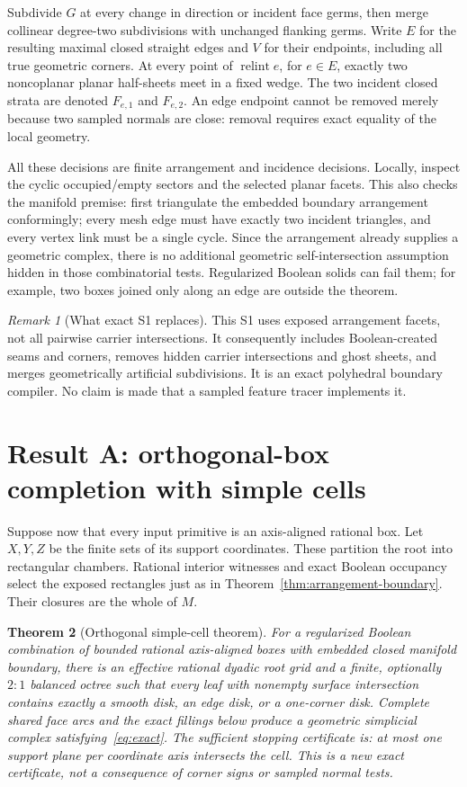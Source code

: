 \documentclass[11pt]{article}
\newtheorem{theorem}{Theorem}[section]
\theoremstyle{definition}
\theoremstyle{remark}
\newtheorem{remark}[theorem]{Remark}
\newcommand{\relint}{\operatorname{relint}}
\begin{document}
Subdivide $G$ at every change in direction or incident face germs, then
merge collinear degree-two subdivisions with unchanged flanking germs.
Write $E$ for the resulting maximal closed straight edges and $V$ for
their endpoints, including all true geometric corners. At every point
of $\relint e$, for $e\in E$, exactly two noncoplanar planar half-sheets
meet in a fixed wedge. The two incident closed strata are denoted
$F_{e,1}$ and $F_{e,2}$. An edge endpoint cannot be removed merely because
two sampled normals are close: removal requires exact equality of the
local geometry.

All these decisions are finite arrangement and incidence decisions.
Locally, inspect the cyclic occupied/empty sectors and the selected planar
facets. This also checks the manifold premise: first triangulate the
embedded boundary arrangement conformingly; every mesh edge must have
exactly two incident triangles, and every vertex link must be a single
cycle. Since the arrangement already supplies a geometric complex,
there is no additional geometric self-intersection assumption hidden in
those combinatorial tests. Regularized Boolean solids can fail them;
for example, two boxes joined only along an edge are outside the theorem.

\begin{remark}[What exact S1 replaces]
This S1 uses exposed arrangement facets, not all pairwise carrier
intersections. It consequently includes Boolean-created seams and corners,
removes hidden carrier intersections and ghost sheets, and merges
geometrically artificial subdivisions. It is an exact polyhedral boundary
compiler. No claim is made that a sampled feature tracer implements it.
\end{remark}

\section{Result A: orthogonal-box completion with simple cells}
\label{sec:orthogonal}

Suppose now that every input primitive is an axis-aligned rational box.
Let $X,Y,Z$ be the finite sets of its support coordinates. These partition
the root into rectangular chambers. Rational interior witnesses and exact
Boolean occupancy select the exposed rectangles just as in
Theorem~\ref{thm:arrangement-boundary}. Their closures are the whole of $M$.

\begin{theorem}[Orthogonal simple-cell theorem]
\label{thm:orthogonal}
For a regularized Boolean combination of bounded rational axis-aligned
boxes with embedded closed manifold boundary, there is an effective
rational dyadic root grid and a finite, optionally $2{:}1$ balanced octree
such that every leaf with nonempty surface intersection contains exactly
a smooth disk, an edge disk, or a one-corner disk. Complete shared face
arcs and the exact fillings below
produce a geometric simplicial complex satisfying~\eqref{eq:exact}.
The sufficient stopping certificate is: \emph{at most one support plane
per coordinate axis intersects the cell}. This is a new exact certificate,
not a consequence of corner signs or sampled normal tests.
\end{theorem}
\end{document}
